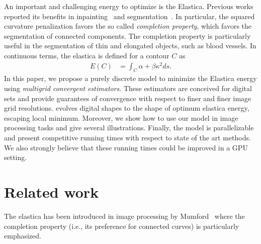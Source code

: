 \documentclass[review]{siamart220329}
\begin{document}
An important and challenging energy to optimize is the Elastica. Previous works reported its benefits in inpainting~\cite{masnou98inpainting,ballester01filljoint,chan02elasticainpainting} and segmentation~\cite{goldluecke11totalcurvature,zhu2013image,nieuwenhuis14efficient, antunes20}. In particular, the squared curvature penalization favors the so called \emph{completion property}, which favors the segmentation of connected components. The completion property is particularly useful in the segmentation of thin and elongated objects, such as blood vessels. In continuous terms, the elastica is defined for a contour $C$ as
%
%
\begin{align*}
	E(C) &= \int_{C}{\alpha + \beta \kappa^2 ds}.
\end{align*}
%
%
In this paper, we propose a purely discrete model to minimize the Elastica energy using \emph{multigrid convergent estimators}. These estimators are conceived for digital sets and provide guarantees of convergence with respect to finer and finer image grid resolutions.  evolves digital shapes to the shape of optimum elastica energy, escaping local minimum. Moreover, we show how to use our model in image processing tasks and give several illustrations. Finally, the model is parallelizable and present competitive running times with respect to state of the art methods. We also strongly believe that these running times could be improved in a GPU setting.
%
%
\section{Related work}

The elastica has been introduced in image processing by Mumford~\cite{mumford1994elastica} 
where the completion property (i.e., its preference for connected curves) is 
particularly emphasized.
\end{document}
